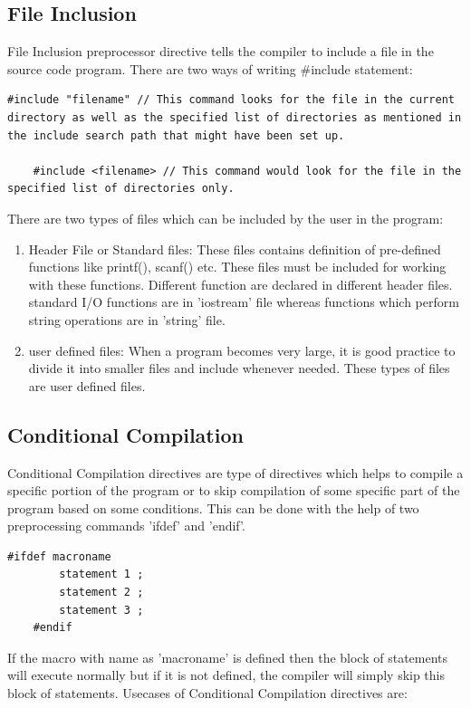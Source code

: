 \subsection{File Inclusion}
File Inclusion preprocessor directive tells the compiler to include a file in the source code program. There are two ways of writing \#include statement:

\begin{lstlisting}[style=CStyle]
    #include "filename" // This command looks for the file in the current directory as well as the specified list of directories as mentioned in the include search path that might have been set up.
    
    #include <filename> // This command would look for the file in the specified list of directories only.
\end{lstlisting}

There are two types of files which can be included by the user in the program: 
\begin{enumerate}
    \item Header File or Standard files: These files contains definition of pre-defined functions like printf(), scanf() etc. These files must be included for working with these functions. Different function are declared in different header files. \eg standard I/O functions are in 'iostream' file whereas functions which perform string operations are in 'string' file.
    \item user defined files: When a program becomes very large, it is good practice to divide it into smaller files and include whenever needed. These types of files are user defined files. 
\end{enumerate}

\subsection{Conditional Compilation}
Conditional Compilation directives are type of directives which helps to compile a specific portion of the program or to skip compilation of some specific part of the program based on some conditions. This can be done with the help of two preprocessing commands 'ifdef' and 'endif'. 

\begin{lstlisting}[style=CStyle]
    #ifdef macroname
        statement 1 ;
        statement 2 ;
        statement 3 ;
    #endif
\end{lstlisting}

\par If the macro with name as 'macroname' is defined then the block of statements will execute normally but if it is not defined, the compiler will simply skip this block of statements. Usecases of Conditional Compilation directives are:

